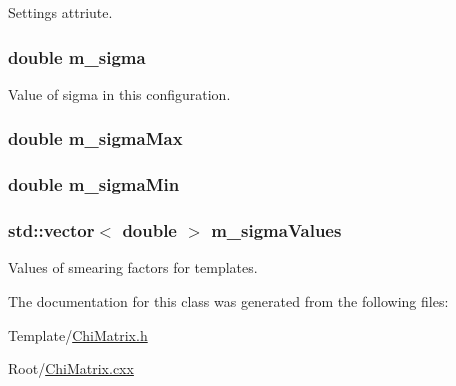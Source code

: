 Settings attriute. 

\hypertarget{classTemplateMethod_1_1ChiMatrix_ac3dd97777097643fc2d2a4222085bb53}{
\subsubsection[{m\+\_\+sigma}]{\setlength{\rightskip}{0pt plus 5cm}double m\+\_\+sigma\hspace{0.3cm}{\ttfamily [private]}}}\label{classTemplateMethod_1_1ChiMatrix_ac3dd97777097643fc2d2a4222085bb53}


Value of sigma in this configuration. 

\hypertarget{classTemplateMethod_1_1ChiMatrix_a7937a5006644ba54017505e4b0391373}{
\subsubsection[{m\+\_\+sigma\+Max}]{\setlength{\rightskip}{0pt plus 5cm}double m\+\_\+sigma\+Max\hspace{0.3cm}{\ttfamily [private]}}}\label{classTemplateMethod_1_1ChiMatrix_a7937a5006644ba54017505e4b0391373}
\hypertarget{classTemplateMethod_1_1ChiMatrix_af8250b530131b08cb2399716ca64562b}{
\subsubsection[{m\+\_\+sigma\+Min}]{\setlength{\rightskip}{0pt plus 5cm}double m\+\_\+sigma\+Min\hspace{0.3cm}{\ttfamily [private]}}}\label{classTemplateMethod_1_1ChiMatrix_af8250b530131b08cb2399716ca64562b}
\hypertarget{classTemplateMethod_1_1ChiMatrix_a15faeee74a1b950760c12c1a4f1fb22c}{
\subsubsection[{m\+\_\+sigma\+Values}]{\setlength{\rightskip}{0pt plus 5cm}std\+::vector$<$ double $>$ m\+\_\+sigma\+Values\hspace{0.3cm}{\ttfamily [private]}}}\label{classTemplateMethod_1_1ChiMatrix_a15faeee74a1b950760c12c1a4f1fb22c}


Values of smearing factors for templates. 



The documentation for this class was generated from the following files\+:\begin{DoxyCompactItemize}
\item 
Template/\hyperlink{ChiMatrix_8h}{Chi\+Matrix.\+h}\item 
Root/\hyperlink{ChiMatrix_8cxx}{Chi\+Matrix.\+cxx}\end{DoxyCompactItemize}

